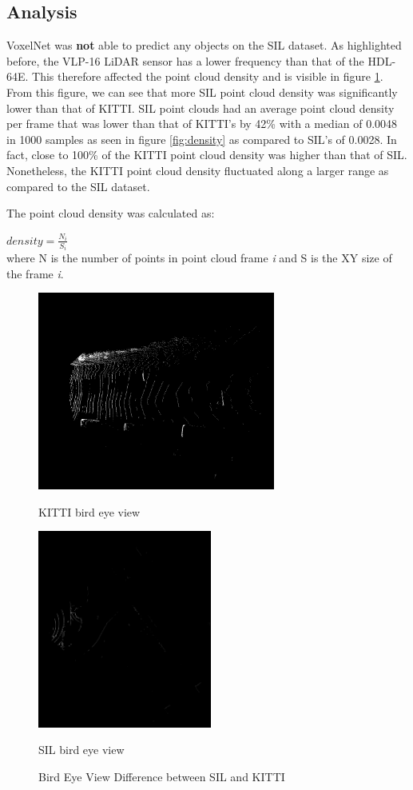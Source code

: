 \subsection*{Analysis}
VoxelNet was \textbf{not} able to predict any objects on the SIL dataset. As highlighted before, the VLP-16 LiDAR sensor has a lower frequency than that of the HDL-64E. This therefore affected the point cloud density and is visible in figure \ref{fig:difference}. From this figure, we can see that more SIL point cloud density was significantly lower than that of KITTI. SIL point clouds had an average point cloud density per frame that was lower than that of KITTI's by 42\%  with a median of 0.0048 in 1000 samples as seen in figure \ref{fig:density} as compared to SIL's of 0.0028. In fact, close to 100\% of the KITTI point cloud density was higher than that of SIL. Nonetheless, the KITTI point cloud density fluctuated along a larger range as compared to the SIL dataset.

The point cloud density was calculated as: 

$density = \frac{N_{i}}{S_{i}}  $  \\
where N is the number of points in point cloud frame \textit{i} and S is the XY size of the frame \textit{i}.

\begin{figure}[H] %
	\centering
	\begin{minipage}[b]{0.49\textwidth}
		\includegraphics[width=\textwidth,height=6.5cm]{images/kitti_bv}
		\caption*{KITTI bird eye view}
	\end{minipage}
	\begin{minipage}[b]{0.49\textwidth}
		\includegraphics[width=\textwidth,height=6.5cm]{images/sil_bv}
		\caption*{SIL bird eye view}
	\end{minipage}
	\caption{Bird Eye View Difference between SIL and KITTI}
	\label{fig:difference}
\end{figure}

